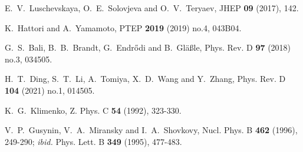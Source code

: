 \begin{thebibliography}{1000}
E.~V.~Luschevskaya, O.~E.~Solovjeva and O.~V.~Teryaev,
JHEP \textbf{09} (2017), 142.

K.~Hattori and A.~Yamamoto,
PTEP \textbf{2019} (2019) no.4, 043B04.

G.~S.~Bali, B.~B.~Brandt, G.~Endr\H{o}di and B.~Gl\"a\ss{}le,
Phys. Rev. D \textbf{97} (2018) no.3, 034505.

H.~T.~Ding, S.~T.~Li, A.~Tomiya, X.~D.~Wang and Y.~Zhang,
Phys. Rev. D \textbf{104} (2021) no.1, 014505.



K.~G.~Klimenko,
Z. Phys. C \textbf{54} (1992), 323-330.

V.~P.~Gusynin, V.~A.~Miransky and I.~A.~Shovkovy,
Nucl. Phys. B \textbf{462} (1996), 249-290; {\it ibid.}
Phys. Lett. B \textbf{349} (1995), 477-483.


\end{thebibliography}
